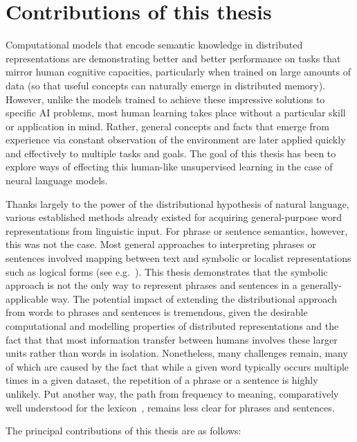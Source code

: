 
\section{Contributions of this thesis}

Computational models that encode semantic knowledge in distributed representations are demonstrating better and better performance on tasks that mirror human cognitive capacities, particularly when trained on large amounts of data (so that useful concepts can naturally emerge in distributed memory). However, unlike the models trained to achieve these impressive solutions to specific AI problems, most human learning takes place without a particular skill or application in mind. Rather, general concepts and facts that emerge from experience via constant observation of the environment are later applied quickly and effectively to multiple tasks and goals. The goal of this thesis has been to explore ways of effecting this human-like unsupervised learning in the case of neural language models.

Thanks largely to the power of the distributional hypothesis of natural language, various established methods already existed for acquiring general-purpose word representations from linguistic input. For phrase or sentence semantics, however, this was not the case. Most general approaches to interpreting phrases or sentences involved mapping between text and symbolic or localist representations such as logical forms (see e.g.~\citealt{poon2009unsupervised}). This thesis demonstrates that the symbolic approach is not the only way to represent phrases and sentences in a generally-applicable way. The potential impact of extending the distributional approach from words to phrases and sentences is tremendous, given the desirable computational and modelling properties of distributed representations and the fact that that most information transfer between humans involves these larger units rather than words in isolation. Nonetheless, many challenges remain, many of which are caused by the fact that while a given word typically occurs multiple times in a given dataset, the repetition of a phrase or a sentence is highly unlikely. Put another way, the path from frequency to meaning, comparatively well understood for the lexicon~\citep{turney2010frequency}, remains less clear for phrases and sentences.    

The principal contributions of this thesis are as follows:

